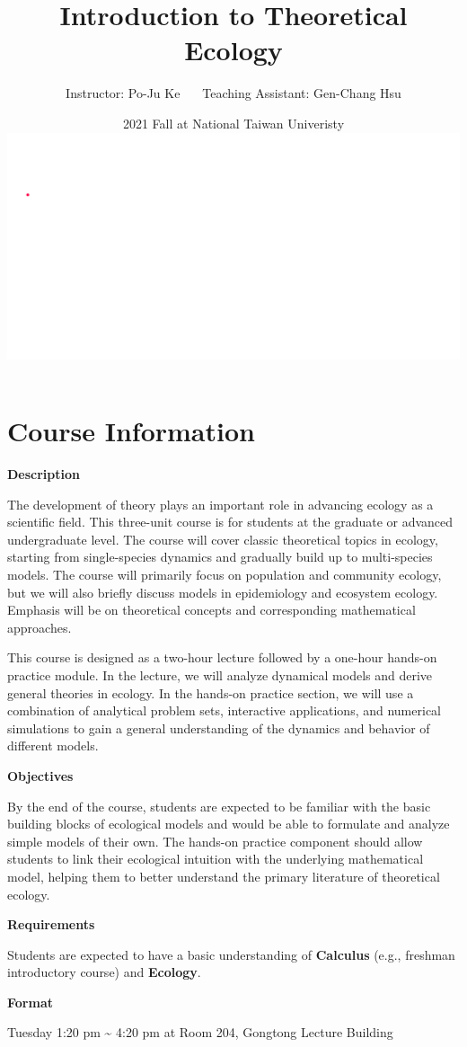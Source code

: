\documentclass[
]{book}
\title{Introduction to Theoretical Ecology}
\author{Instructor: Po-Ju Ke \(~~~~~\) Teaching Assistant: Gen-Chang Hsu}
\date{2021 Fall at National Taiwan Univeristy \includegraphics{./bifurcation.gif}}
\begin{document}
\maketitle

{
\setcounter{tocdepth}{1}
\tableofcontents
}
\hypertarget{course-information}{%
\chapter*{Course Information}\label{course-information}}

\textbf{Description}

The development of theory plays an important role in advancing ecology as a scientific field. This three-unit course is for students at the graduate or advanced undergraduate level. The course will cover classic theoretical topics in ecology, starting from single-species dynamics and gradually build up to multi-species models. The course will primarily focus on population and community ecology, but we will also briefly discuss models in epidemiology and ecosystem ecology. Emphasis will be on theoretical concepts and corresponding mathematical approaches.

This course is designed as a two-hour lecture followed by a one-hour hands-on practice module. In the lecture, we will analyze dynamical models and derive general theories in ecology. In the hands-on practice section, we will use a combination of analytical problem sets, interactive applications, and numerical simulations to gain a general understanding of the dynamics and behavior of different models.

\textbf{Objectives}

By the end of the course, students are expected to be familiar with the basic building blocks of ecological models and would be able to formulate and analyze simple models of their own. The hands-on practice component should allow students to link their ecological intuition with the underlying mathematical model, helping them to better understand the primary literature of theoretical ecology.

\textbf{Requirements}

Students are expected to have a basic understanding of \textbf{Calculus} (e.g., freshman introductory course) and \textbf{Ecology}.

\textbf{Format}

Tuesday 1:20 pm \textasciitilde{} 4:20 pm at Room 204, Gongtong Lecture Building
\end{document}

